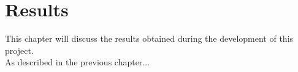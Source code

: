 \chapter{Results}\label{chp:results}
This chapter will discuss the results obtained during the development of this project.\\
As described in the previous chapter...